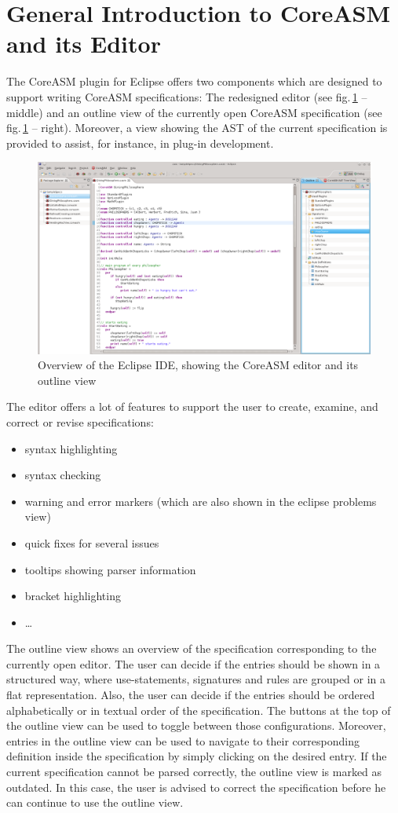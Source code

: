 \documentclass[10pt,oneside,a4paper]{article}
\begin{document}
\section{General Introduction to CoreASM and its Editor}
The CoreASM plugin for Eclipse offers two components which are designed to support writing CoreASM specifications: The redesigned editor (see fig.\,\ref{fig:editor} -- middle) and an outline view of the currently open CoreASM specification (see fig.\,\ref{fig:editor} -- right).
Moreover, a view showing the AST of the current specification is provided to assist, for instance, in plug-in development.

\begin{figure}[h]
\centering
\includegraphics[width=\textwidth]{images/editor.png}
\caption{Overview of the Eclipse IDE, showing the CoreASM editor and its outline view}
\label{fig:editor}
\end{figure}


The editor offers a lot of features to support the user to create, examine, and correct or revise specifications:
\begin{itemize}
	\item syntax highlighting
	\item syntax checking
	\item warning and error markers (which are also shown in the eclipse problems view)
	\item quick fixes for several issues
	\item tooltips showing parser information
	\item bracket highlighting
	\item \ldots
\end{itemize}

The outline view shows an overview of the specification corresponding to the currently open editor. The user can decide if the entries should be shown in a structured way, where use-statements, signatures and rules are grouped or in a flat representation. Also, the user can decide if the entries should be ordered alphabetically or in textual order of the specification. The buttons at the top of the outline view can be used to toggle between those configurations. Moreover, entries in the outline view can be used to navigate to their corresponding definition inside the specification by simply clicking on the desired entry. If the current specification cannot be parsed correctly, the outline view is marked as outdated. In this case, the user is advised to correct the specification before he can continue to use the outline view.
\end{document}
